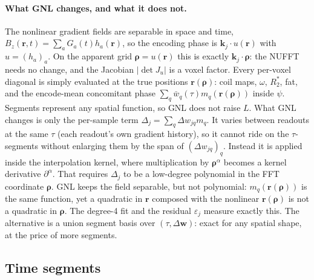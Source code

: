 \documentclass[11pt]{article}
\theoremstyle{remark}
\newcommand{\rr}{\bm r}
\newcommand{\kk}{\bm k}
\begin{document}
\paragraph{What GNL changes, and what it does not.} The nonlinear gradient fields are separable in space and time, $B_z(\rr,t)=\sum_aG_a(t)h_a(\rr)$, so the encoding phase is $\kk_j\!\cdot\!u(\rr)$ with $u=(h_a)_a$. On the apparent grid $\bm\rho=u(\rr)$ this is exactly $\kk_j\!\cdot\!\bm\rho$: the NUFFT needs no change, and the Jacobian $|\det J_u|$ is a voxel factor. Every per-voxel diagonal is simply evaluated at the true positions $\rr(\bm\rho)$: coil maps, $\omega$, $R_2^*$, fat, and the encode-mean concomitant phase $\sum_q\bar w_q(\tau)m_q(\rr(\bm\rho))$ inside $\psi$. Segments represent any spatial function, so GNL does not raise $L$.
What GNL changes is only the per-sample term $\Delta_j=\sum_q\Delta w_{jq}m_q$. It varies between readouts at the same $\tau$ (each readout's own gradient history), so it cannot ride on the $\tau$-segments without enlarging them by the span of $(\Delta w_{jq})_q$. Instead it is applied inside the interpolation kernel, where multiplication by $\bm\rho^\alpha$ becomes a kernel derivative $\partial^\alpha$. That requires $\Delta_j$ to be a low-degree polynomial in the FFT coordinate $\bm\rho$. GNL keeps the field separable, but not polynomial: $m_q(\rr(\bm\rho))$ is the same function, yet a quadratic in $\rr$ composed with the nonlinear $\rr(\bm\rho)$ is not a quadratic in $\bm\rho$. The degree-4 fit and the residual $\varepsilon_j$ measure exactly this. The alternative is a union segment basis over $(\tau,\Delta\bm w)$: exact for any spatial shape, at the price of more segments.

\subsection{Time segments}
\label{sec:segments}
\end{document}
